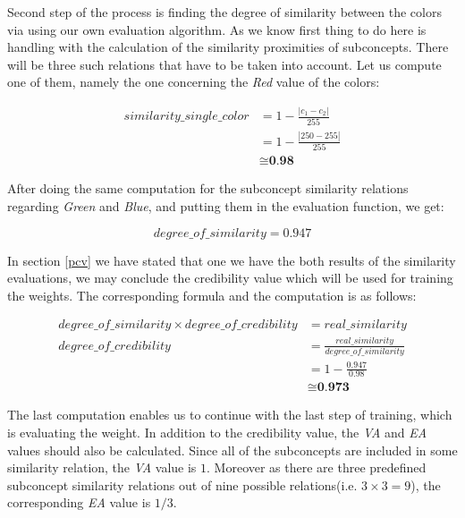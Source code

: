 \documentclass[egilmezThesis.tex]{subfiles}
\begin{document}
Second step of the process is finding the degree of similarity between the colors via using our own evaluation algorithm.  As we know first thing to do here is handling with the calculation of the similarity proximities of subconcepts. There will be three such relations that have to be taken into account. Let us compute one of them, namely the one concerning the \textit{Red} value of the colors:

\begin{equation}
\begin{split}
similarity\_single\_color &= 1 - \frac{|c_1-c_2|}{255}\\
&=1 - \frac{|250-255|}{255}\\
&\cong{\textbf{0.98}}
\end{split} 
\end{equation}

After doing the same computation for the subconcept similarity relations regarding \textit{Green} and \textit{Blue}, and putting them in the evaluation function, we get:

$$degree\_of\_similarity = 0.947$$

In section \ref{pcv} we have stated that one we have the both results of the similarity evaluations, we may conclude the credibility value which will be used for training the weights. The corresponding formula and the computation is as follows:

\begin{equation}
\begin{split}
degree\_of\_similarity \times degree\_of\_credibility &= real\_similarity \\
degree\_of\_credibility &= \frac{real\_similarity}{degree\_of\_similarity} \\
&=1 - \frac{0.947}{0.98}\\
&\cong{\textbf{0.973}}
\end{split} 
\end{equation}

The last computation enables us to continue with the last step of training, which is evaluating the weight.
In addition to the credibility value, the \textit{VA} and \textit{EA} values should also be calculated. Since all of the subconcepts are included in some similarity relation, the \textit{VA} value is $1$. Moreover as there are three predefined subconcept similarity relations out of nine possible relations(i.e. $3\times3 = 9$), the corresponding \textit{EA} value is $1/3$.
\end{document}

